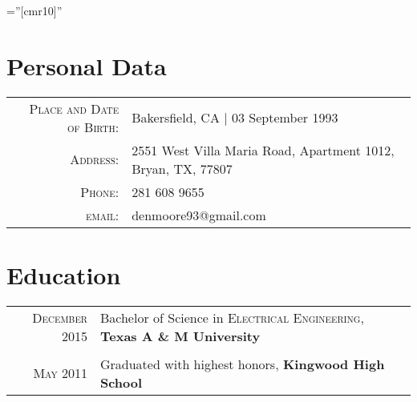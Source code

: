 \documentclass[a4paper,10pt]{article} %
\begin{document}
\pagestyle{empty} %

\font\fb=''[cmr10]'' %


\par{\bigskip\par} %

\section{Personal Data}

\begin{tabular}{rl}
\textsc{Place and Date of Birth:} & Bakersfield, CA  | 03 September 1993 \\
\textsc{Address:} & 2551 West Villa Maria Road, Apartment 1012, Bryan, TX, 77807 \\
\textsc{Phone:} & 281 608 9655\\
\textsc{email:} & denmoore93@gmail.com
\end{tabular}



\section{Education}

\begin{tabular}{rl}	
\textsc{December} 2015 & Bachelor of Science in \textsc{Electrical Engineering}, \textbf{Texas A \& M University}\\
&\\


\textsc{May} 2011& Graduated with highest honors, \textbf{Kingwood High School}\\


\end{tabular}



\end{document}
